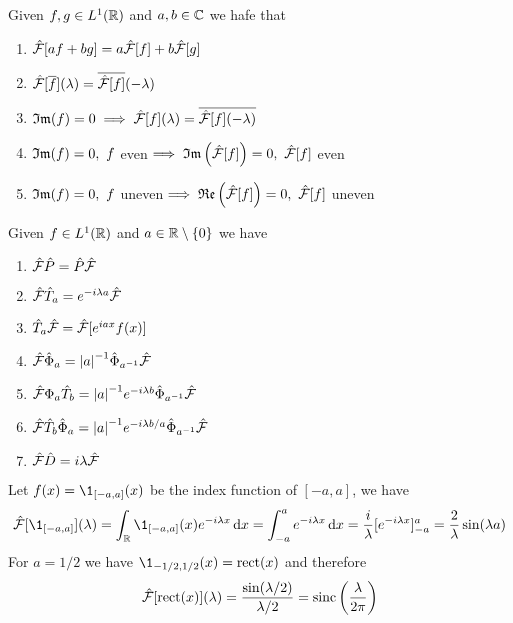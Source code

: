 \documentclass[../complete.tex]{subfiles}
\begin{document}
\begin{thm}
	Given $f,g\in L^1(\mathbb{R})$ and $a,b\in\mathbb{C}$ we hafe that
	\begin{enumerate}
	\item $\hat{\mathcal{F}}[af+bg]=a\hat{\mathcal{F}}[f]+b\hat{\mathcal{F}}[g]$
	\item $\hat{\mathcal{F}}[\overline{f}](\lambda)=\overline{\hat{\mathcal{F}}[f]}(-\lambda)$
	\item $\mathfrak{Im}(f)=0\implies\hat{\mathcal{F}}[f](\lambda)=\overline{\hat{\mathcal{F}}[f](-\lambda)}$
	\item $\mathfrak{Im}(f)=0,\ f$ even$\implies\imaginary\left( \fou[f] \right)=0,\ \fou[f]$ even
	\item $\mathfrak{Im}(f)=0,\ f$ uneven$\implies\real\left(\fou[f]\right)=0,\ \fou[f]$ uneven
	\end{enumerate}
\end{thm}
\begin{thm}
	Given $f\in L^1(\mathbb{R})$ and $a\in\mathbb{R}\setminus\{0\}$ we have
	\begin{enumerate}
	\item $\hat{\mathcal{F}}\hat{P}=\hat{P}\hat{\mathcal{F}}$
	\item $\hat{\mathcal{F}}\hat{T}_a=e^{-i\lambda a}\hat{\mathcal{F}}$
	\item $\hat{T}_a\hat{\mathcal{F}}=\hat{\mathcal{F}}[e^{iax}f(x)]$
	\item $\hat{\mathcal{F}}\hat{\Phi}_a=\abs{a}^{-1}\hat{\Phi}_{a^{-1}}\hat{\mathcal{F}}$
	\item $\hat{\mathcal{F}}\Phi_a\hat{T}_b=\abs{a}^{-1}e^{-i\lambda b}\hat{\Phi}_{a^{-1}}\hat{\mathcal{F}}$
	\item $\hat{\mathcal{F}}\hat{T}_b\hat{\Phi}_a=\abs{a}^{-1}e^{-i\lambda b/a}\hat{\Phi}_{a^{-1}}\hat{\mathcal{F}}$
	\item $\hat{\mathcal{F}}\hat{D}=i\lambda\hat{\mathcal{F}}$
	\end{enumerate}
\end{thm}
\begin{eg}
	Let $f(x)=\1_{[-a,a]}(x)$ be the index function of $[-a,a]$, we have
	\begin{equation*}
		\fou[\1_{[-a,a]}](\lambda)=\int_{\R}^{}\1_{[-a,a]}(x)e^{-i\lambda x}\diff x=\int_{-a}^{a}e^{-i\lambda x}\diff x=\frac{i}{\lambda}[e^{-i\lambda x}]_{-a}^a=\frac{2}{\lambda}\sin(\lambda a)
	\end{equation*}
	For $a=1/2$ we have $\1_{-1/2,1/2}(x)=\mathrm{rect}(x)$ and therefore
	\begin{equation*}
		\hat{\mathcal{F}}[\mathrm{rect}(x)](\lambda)=\frac{\sin(\lambda/2)}{\lambda/2}=\mathrm{sinc}\left( \frac{\lambda}{2\pi} \right)
	\end{equation*}
\end{eg}
\end{document}
